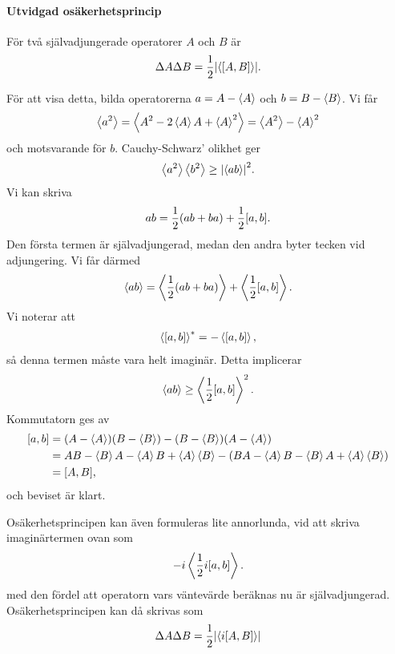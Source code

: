 \paragraph{Utvidgad osäkerhetsprincip}
För två självadjungerade operatorer $A$ och $B$ är
\begin{align*}
	\Delta A\Delta B = \frac{1}{2}\abs{\expval{[A, B]}}.
\end{align*}

För att visa detta, bilda operatorerna $a = A - \expval{A}$ och $b = B - \expval{B}$. Vi får
\begin{align*}
	\expval{a^{2}} = \expval{A^{2} - 2\expval{A}A + \expval{A}^{2}} = \expval{A^{2}} - \expval{A}^{2}
\end{align*}
och motsvarande för $b$. Cauchy-Schwarz' olikhet ger
\begin{align*}
	\expval{a^{2}}\expval{b^{2}}\geq\abs{\expval{ab}}^{2}.
\end{align*}
Vi kan skriva
\begin{align*}
	ab = \frac{1}{2}(ab + ba) + \frac{1}{2}[a, b].
\end{align*}
Den första termen är självadjungerad, medan den andra byter tecken vid adjungering. Vi får därmed
\begin{align*}
	\expval{ab} = \expval{\frac{1}{2}(ab + ba)} + \expval{\frac{1}{2}[a, b]}.
\end{align*}
Vi noterar att
\begin{align*}
	\expval{[a, b]}^{*} = -\expval{[a, b]},
\end{align*}
så denna termen måste vara helt imaginär. Detta implicerar
\begin{align*}
	\expval{ab} \geq \expval{\frac{1}{2}[a, b]}^{2}.
\end{align*}
Kommutatorn ges av
\begin{align*}
	[a, b] &= (A - \expval{A})(B - \expval{B}) - (B - \expval{B})(A - \expval{A}) \\
	              &= AB - \expval{B}A - \expval{A}B + \expval{A}\expval{B} - (BA - \expval{A}B - \expval{B}A + \expval{A}\expval{B}) \\
	              &= [A, B],
\end{align*}
och beviset är klart.

Osäkerhetsprincipen kan även formuleras lite annorlunda, vid att skriva imaginärtermen ovan som
\begin{align*}
	-i\expval{\frac{1}{2}i[a, b]}.
\end{align*}
med den fördel att operatorn vars väntevärde beräknas nu är självadjungerad. Osäkerhetsprincipen kan då skrivas som
\begin{align*}
	\Delta A\Delta B = \frac{1}{2}\abs{\expval{i[A, B]}}
\end{align*}

